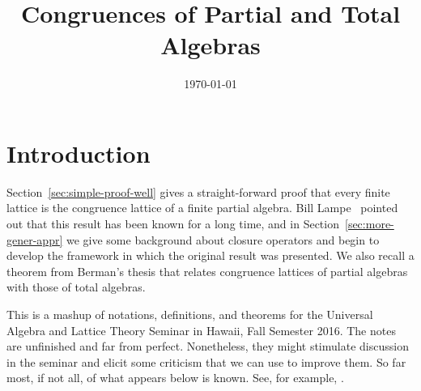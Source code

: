 
\usepackage{inputs/proof-dashed}



\usepackage{inputs/macros}

\usepackage[backend=bibtex]{biblatex}




\title{Congruences of Partial and Total Algebras}
\date{\today}


\maketitle


\section{Introduction}
\label{sec:introduction}
Section~\ref{sec:simple-proof-well} gives a straight-forward proof that every finite
lattice is the congruence lattice of a finite partial algebra.
Bill Lampe~\cite{Lampe:20161017} pointed out
that this result has been known for a long time, and in
Section~\ref{sec:more-gener-appr}
we give some background about closure operators and 
begin to develop the framework in which the original result was presented.
We also recall a theorem from Berman's thesis that relates congruence lattices of
partial algebras with those of total algebras.

This is a mashup of notations, definitions, and theorems
for the Universal Algebra and Lattice Theory Seminar
in Hawaii, Fall Semester 2016. 
The notes are unfinished and far from perfect.
Nonetheless, they might stimulate discussion
in the seminar and elicit some criticism
that we can use to improve them.
So far most, if not all, of what appears below is known.
See, for example, \cite{MR2619731, MR0308011, MR0237401, MR2455216}.


